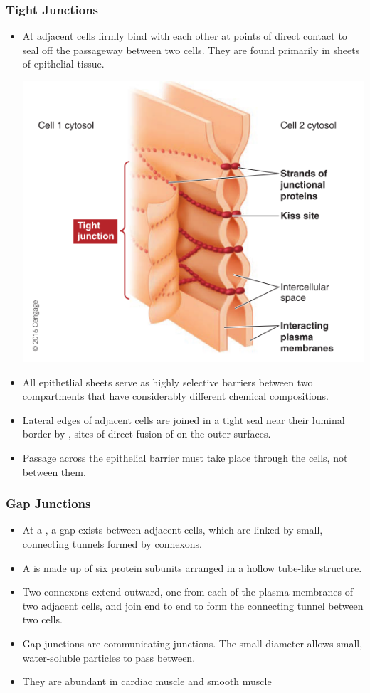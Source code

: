 \documentclass{article}
\numberwithin{equation}{section}
\begin{document}
\subsubsection{Tight Junctions}
\begin{itemize}
    \item At  adjacent cells firmly bind with each other at points of direct contact to seal off the passageway between two cells. They are found primarily in sheets of epithelial tissue.
    \begin{center}
        \includegraphics[width=0.5\linewidth]{figures/tight_junction.png}
    \end{center}
    \item All epithetlial sheets serve as highly selective barriers between two compartments that have considerably different chemical compositions.
    \item Lateral edges of adjacent cells are joined in a tight seal near their luminal border by , sites of direct fusion of  on the outer surfaces.
    \item Passage across the epithelial barrier must take place through the cells, not between them.
\end{itemize}
\subsubsection{Gap Junctions}
\begin{itemize}
    \item At a , a gap exists between adjacent cells, which are linked by small, connecting tunnels formed by connexons.
    \item A  is made up of six protein subunits arranged in a hollow tube-like structure.
    \item Two connexons extend outward, one from each of the plasma membranes of two adjacent cells, and join end to end to form the connecting tunnel between two cells.
    \item Gap junctions are communicating junctions. The small diameter allows small, water-soluble particles to pass between.
    \item They are abundant in cardiac muscle and smooth muscle
\end{itemize}
\end{document}
